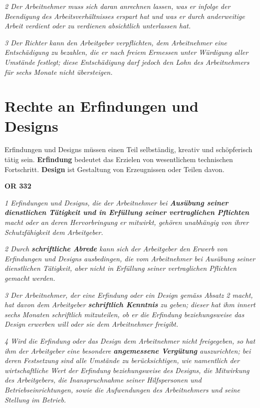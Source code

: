\begin{description}
  \textit{2 Der Arbeitnehmer muss sich daran anrechnen lassen, was er infolge der Beendigung des Arbeitsverhältnisses erspart hat und was er durch anderweitige Arbeit verdient oder zu verdienen absichtlich unterlassen hat.}

  \textit{3 Der Richter kann den Arbeitgeber verpflichten, dem Arbeitnehmer eine Entschädigung zu bezahlen, die er nach freiem Ermessen unter Würdigung aller Umstände festlegt; diese Entschädigung darf jedoch den Lohn des Arbeitnehmers für sechs Monate nicht übersteigen.}

\end{description}

\section{Rechte an Erfindungen und Designs}

Erfindungen und Designs müssen einen Teil selbständig, kreativ und schöpferisch tätig sein. \textbf{Erfindung} bedeutet das Erzielen von wesentlichem technischen Fortschritt. \textbf{Design} ist Gestaltung von Erzeugnissen oder Teilen davon.

\vspace{3mm}
\textbf{OR 332}

\textit{1 Erfindungen und Designs, die der Arbeitnehmer bei \textbf{Ausübung seiner dienstlichen Tätigkeit und in Erfüllung seiner vertraglichen Pflichten} macht oder an deren Hervorbringung er mitwirkt, gehören unabhängig von ihrer Schutzfähigkeit dem Arbeitgeber.}

\textit{2 Durch \textbf{schriftliche Abrede} kann sich der Arbeitgeber den Erwerb von Erfindungen und Designs ausbedingen, die vom Arbeitnehmer bei Ausübung seiner dienstlichen Tätigkeit, aber nicht in Erfüllung seiner vertraglichen Pflichten gemacht werden.}

\textit{3 Der Arbeitnehmer, der eine Erfindung oder ein Design gemäss Absatz 2 macht, hat davon dem Arbeitgeber \textbf{schriftlich Kenntnis} zu geben; dieser hat ihm innert sechs Monaten schriftlich mitzuteilen, ob er die Erfindung beziehungsweise das Design erwerben will oder sie dem Arbeitnehmer freigibt.}

\textit{4 Wird die Erfindung oder das Design dem Arbeitnehmer nicht freigegeben, so hat ihm der Arbeitgeber eine besondere \textbf{angemessene Vergütung} auszurichten; bei deren Festsetzung sind alle Umstände zu berücksichtigen, wie namentlich der wirtschaftliche Wert der Erfindung beziehungsweise des Designs, die Mitwirkung des Arbeitgebers, die Inanspruchnahme seiner Hilfspersonen und Betriebseinrichtungen, sowie die Aufwendungen des Arbeitnehmers und seine Stellung im Betrieb.}

